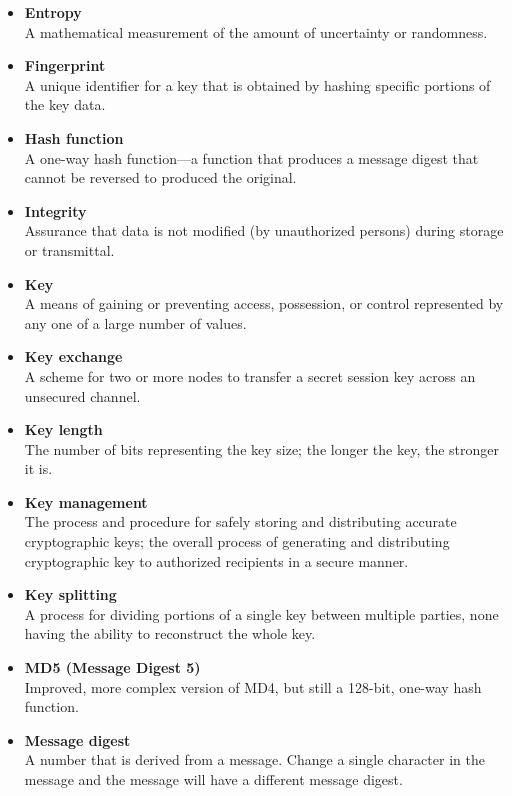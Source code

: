 \begin{itemize}
\item \textbf{Entropy}\\
A mathematical measurement of the amount of uncertainty or randomness.

\item \textbf{Fingerprint}\\
A unique identifier for a key that is obtained by hashing specific portions of the key data.

\item \textbf{Hash function}\\
A one-way hash function—a function that produces a message digest that cannot be reversed to produced the original.

\item \textbf{Integrity}\\
Assurance that data is not modified (by unauthorized persons) during storage or transmittal.

\item \textbf{Key}\\
A means of gaining or preventing access, possession, or control represented by any one of a large number of values.

\item \textbf{Key exchange}\\
A scheme for two or more nodes to transfer a secret session key across an unsecured channel.

\item \textbf{Key length}\\
The number of bits representing the key size; the longer the key, the stronger it is.

\item \textbf{Key management}\\
The process and procedure for safely storing and distributing accurate cryptographic keys; the overall process of generating and distributing cryptographic key to authorized recipients in a secure manner.

\item \textbf{Key splitting}\\
A process for dividing portions of a single key between multiple parties, none having the ability to reconstruct the whole key.

\item \textbf{MD5 (Message Digest 5)}\\
Improved, more complex version of MD4, but still a 128-bit, one-way hash function.

\item \textbf{Message digest}\\
A number that is derived from a message. Change a single character in the message and the message will have a different message digest.


\end{itemize}
